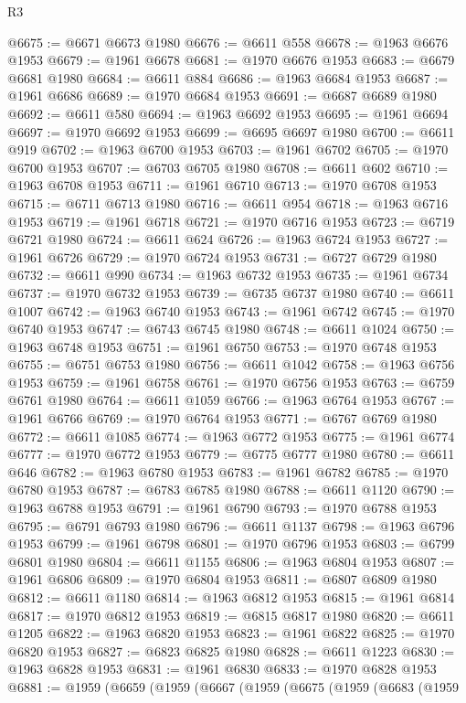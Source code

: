 \begin{lexlean}{R3}
\begin{coremodule}
@6675 := @6671 @6673 @1980
@6676 := @6611 @558
@6678 := @1963 @6676 @1953
@6679 := @1961 @6678
@6681 := @1970 @6676 @1953
@6683 := @6679 @6681 @1980
@6684 := @6611 @884
@6686 := @1963 @6684 @1953
@6687 := @1961 @6686
@6689 := @1970 @6684 @1953
@6691 := @6687 @6689 @1980
@6692 := @6611 @580
@6694 := @1963 @6692 @1953
@6695 := @1961 @6694
@6697 := @1970 @6692 @1953
@6699 := @6695 @6697 @1980
@6700 := @6611 @919
@6702 := @1963 @6700 @1953
@6703 := @1961 @6702
@6705 := @1970 @6700 @1953
@6707 := @6703 @6705 @1980
@6708 := @6611 @602
@6710 := @1963 @6708 @1953
@6711 := @1961 @6710
@6713 := @1970 @6708 @1953
@6715 := @6711 @6713 @1980
@6716 := @6611 @954
@6718 := @1963 @6716 @1953
@6719 := @1961 @6718
@6721 := @1970 @6716 @1953
@6723 := @6719 @6721 @1980
@6724 := @6611 @624
@6726 := @1963 @6724 @1953
@6727 := @1961 @6726
@6729 := @1970 @6724 @1953
@6731 := @6727 @6729 @1980
@6732 := @6611 @990
@6734 := @1963 @6732 @1953
@6735 := @1961 @6734
@6737 := @1970 @6732 @1953
@6739 := @6735 @6737 @1980
@6740 := @6611 @1007
@6742 := @1963 @6740 @1953
@6743 := @1961 @6742
@6745 := @1970 @6740 @1953
@6747 := @6743 @6745 @1980
@6748 := @6611 @1024
@6750 := @1963 @6748 @1953
@6751 := @1961 @6750
@6753 := @1970 @6748 @1953
@6755 := @6751 @6753 @1980
@6756 := @6611 @1042
@6758 := @1963 @6756 @1953
@6759 := @1961 @6758
@6761 := @1970 @6756 @1953
@6763 := @6759 @6761 @1980
@6764 := @6611 @1059
@6766 := @1963 @6764 @1953
@6767 := @1961 @6766
@6769 := @1970 @6764 @1953
@6771 := @6767 @6769 @1980
@6772 := @6611 @1085
@6774 := @1963 @6772 @1953
@6775 := @1961 @6774
@6777 := @1970 @6772 @1953
@6779 := @6775 @6777 @1980
@6780 := @6611 @646
@6782 := @1963 @6780 @1953
@6783 := @1961 @6782
@6785 := @1970 @6780 @1953
@6787 := @6783 @6785 @1980
@6788 := @6611 @1120
@6790 := @1963 @6788 @1953
@6791 := @1961 @6790
@6793 := @1970 @6788 @1953
@6795 := @6791 @6793 @1980
@6796 := @6611 @1137
@6798 := @1963 @6796 @1953
@6799 := @1961 @6798
@6801 := @1970 @6796 @1953
@6803 := @6799 @6801 @1980
@6804 := @6611 @1155
@6806 := @1963 @6804 @1953
@6807 := @1961 @6806
@6809 := @1970 @6804 @1953
@6811 := @6807 @6809 @1980
@6812 := @6611 @1180
@6814 := @1963 @6812 @1953
@6815 := @1961 @6814
@6817 := @1970 @6812 @1953
@6819 := @6815 @6817 @1980
@6820 := @6611 @1205
@6822 := @1963 @6820 @1953
@6823 := @1961 @6822
@6825 := @1970 @6820 @1953
@6827 := @6823 @6825 @1980
@6828 := @6611 @1223
@6830 := @1963 @6828 @1953
@6831 := @1961 @6830
@6833 := @1970 @6828 @1953
@6881 := @1959
    (@6659
      (@1959
        (@6667
          (@1959
            (@6675
              (@1959
                (@6683
                  (@1959

\end{coremodule}
\end{lexlean}
